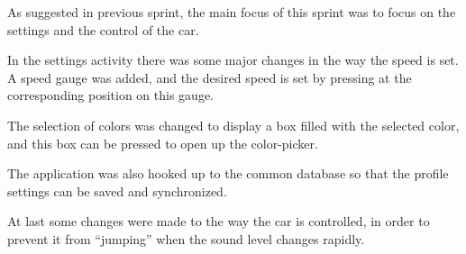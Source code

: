 As suggested in previous sprint, the main focus of this sprint was to focus on the settings and the control of the car.

In the settings activity there was some major changes in the way the speed is set.
A speed gauge was added, and the desired speed is set by pressing at the corresponding position on this gauge.

The selection of colors was changed to display a box filled with the selected color, and this box can be pressed to open up the color-picker.

The application was also hooked up to the common database so that the profile settings can be saved and synchronized.

At last some changes were made to the way the car is controlled, in order to prevent it from ``jumping'' when the sound level changes rapidly.